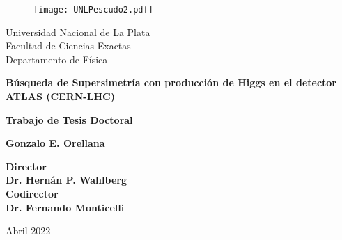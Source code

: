 


\thispagestyle{empty}
\begin{center}

\begin{figure}[h]
\centering
\texttt{[image: UNLPescudo2.pdf]}
\end{figure}

{\large Universidad Nacional de La Plata\\}
{\large Facultad de Ciencias Exactas\\}
{\large Departamento de Física\\}


\vspace{2cm}

\hrulefill

\vspace{0.6cm}

{\bf \LARGE  Búsqueda de Supersimetría con producción de Higgs en el detector ATLAS (CERN-LHC)\\}

\vspace{0.6cm}

\hrulefill

\vspace{0.6cm}

{\large \bf Trabajo de Tesis Doctoral \\}

\vspace{2.5cm}

{\Large \bf Gonzalo E. Orellana \\}

\vspace{3.5cm}

{\large\bf Director \\}
{\large\bf Dr. Hernán P. Wahlberg \\}
\vspace{0.7cm}
{\large\bf Codirector \\}
{\large\bf Dr. Fernando Monticelli \\}

\vspace{2cm}

{\normalsize Abril 2022}

\end{center}



\restoregeometry



